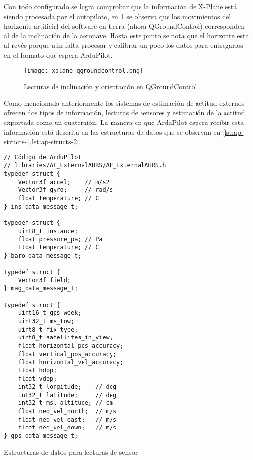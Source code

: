 Con todo configurado se logra comprobar que la información de X-Plane está siendo procesada por el autopiloto, en \cref{fig:qgroundcontrol2} se observa que los movimientos del horizonte artificial del software en tierra (ahora QGroundControl) corresponden al de la inclinación de la aeronave. Hasta este punto se nota que el horizonte esta al revés porque aún falta procesar y calibrar un poco los datos para entregarlos en el formato que espera ArduPilot.

\begin{figure}[h]
    \centering
    \texttt{[image: xplane-qgroundcontrol.png]}
    \caption{Lecturas de inclinación y orientación en QGroundControl}
    \label{fig:qgroundcontrol2}
\end{figure}

Como mencionado anteriormente los sistemas de estimación de actitud externos ofrecen dos tipos de información, lecturas de sensores y estimación de la actitud exportada como un cuaternión. La manera en que ArduPilot espera recibir esta información está descrita en las estructuras de datos que se observan en \cref{lst:ap-structs-1,lst:ap-structs-2}.

\begin{listing}[h]
    \begin{verbatim}
// Código de ArduPilot
// libraries/AP_ExternalAHRS/AP_ExternalAHRS.h
typedef struct {
    Vector3f accel;    // m/s2
    Vector3f gyro;     // rad/s 
    float temperature; // C
} ins_data_message_t;

typedef struct {
    uint8_t instance;
    float pressure_pa; // Pa
    float temperature; // C
} baro_data_message_t;

typedef struct {
    Vector3f field;
} mag_data_message_t;

typedef struct {
    uint16_t gps_week;
    uint32_t ms_tow;
    uint8_t fix_type;
    uint8_t satellites_in_view;
    float horizontal_pos_accuracy;
    float vertical_pos_accuracy;
    float horizontal_vel_accuracy;
    float hdop;
    float vdop;
    int32_t longitude;    // deg
    int32_t latitude;     // deg
    int32_t msl_altitude; // cm
    float ned_vel_north;  // m/s
    float ned_vel_east;   // m/s
    float ned_vel_down;   // m/s
} gps_data_message_t;
    \end{verbatim}
    \caption{Estructuras de datos para lecturas de sensor}
    \label{lst:ap-structs-1}
\end{listing}

